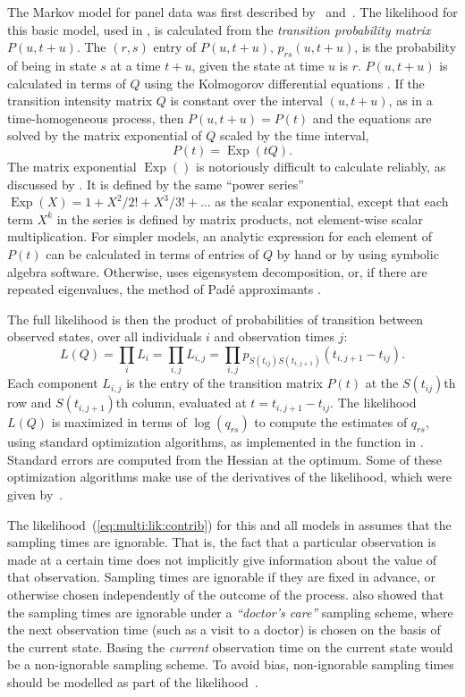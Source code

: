 \documentclass[article,shortnames]{jss}
\newcommand{\Exp}{\mathop{\mathrm{Exp}}}
\begin{document}
The Markov model for panel data was first described
by~\citet{kalbfleisch:lawless} and~\citet{kay:mark}.  The likelihood
for this basic model, used in , is calculated from the
\emph{transition probability matrix} $P(u, t+u)$.  The $(r,s)$ entry
of $P(u, t+u)$, $p_{rs}(u,t+u)$, is the probability of being in state
$s$ at a time $t+u$, given the state at time $u$ is $r$.  $P(u,t+u)$
is calculated in terms of $Q$ using the Kolmogorov differential
equations \citep{cox:miller}.  If the transition intensity matrix $Q$
is constant over the interval $(u,t+u)$, as in a time-homogeneous
process, then $P(u, t+u) = P(t)$ and the equations are solved by the
matrix exponential of $Q$ scaled by the time interval,
\[
  P(t) = \Exp(tQ).
\]
The matrix exponential $\Exp()$ is notoriously difficult to calculate
reliably, as discussed by \citet{matrixexp}.  It is defined by the
same ``power series'' $\Exp(X) = 1 + X^2/2! + X^3/3! + ...$ as the
scalar exponential, except that each term $X^k$ in the series is
defined by matrix products, not element-wise scalar multiplication.
For simpler models, an analytic expression for each element of $P(t)$
can be calculated in terms of entries of $Q$ by hand or by using
symbolic algebra software.  Otherwise,  uses eigensystem
decomposition, or, if there are repeated eigenvalues, the method of
Pad\'e approximants \citep{matrixexp}.

The full likelihood is then the product of probabilities of transition
between observed states, over all individuals $i$ and observation
times $j$:
\begin{equation}
  \label{eq:multi:lik:contrib}
  L(Q) = \prod_i L_i = \prod_{i,j} L_{i, j} =  \prod_{i,j} p_{S(t_{ij})S(t_{i,j+1})}(t_{i,j+1} - t_{ij}).
\end{equation}
Each component $L_{i,j}$ is the entry of the transition matrix $P(t)$
at the $S(t_{ij})$th row and $S(t_{i,j+1})$th column, evaluated at $t
= t_{i,j+1} - t_{ij}$.  The likelihood $L(Q)$ is maximized in terms of
$\log(q_{rs})$ to compute the estimates of $q_{rs}$, using standard
optimization algorithms, as implemented in the  function
in . Standard errors are computed from the Hessian at the
optimum.  Some of these optimization algorithms make use of the
derivatives of the likelihood, which were given
by~\citet{kalbfleisch:lawless}.

The likelihood~(\ref{eq:multi:lik:contrib}) for this and all models in
 assumes that the sampling times are ignorable.  That is, the
fact that a particular observation is made at a certain time does not
implicitly give information about the value of that observation.
Sampling times are ignorable if they are fixed in advance, or
otherwise chosen independently of the outcome of the process.
\citet{gruger:valid} also showed that the sampling times are ignorable
under a \emph{``doctor's care''} sampling scheme, where the next
observation time (such as a visit to a doctor) is chosen on the basis
of the current state.  Basing the \emph{current} observation time on
the current state would be a non-ignorable sampling scheme.  To avoid
bias, non-ignorable sampling times should be modelled as part of the
likelihood~\citep{sweeting:inform:msm:jss}.
\end{document}
